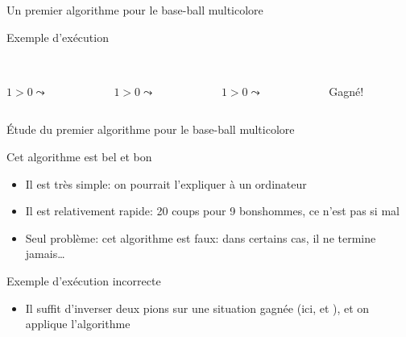 \documentclass[final,hyperref={pdfpagelabels=false}]{beamer}
\renewenvironment{Coupe}{   }{   }
\renewcommand*{\small}{\fontsize{\resultsmallX}{\resultsmallY}\selectfont}
\begin{document}
\begin{Coupe}
\begin{frame}{Un premier algorithme pour le base-ball multicolore}
\begin{block}{Exemple d'exécution}
\begin{columns}[t]
      \begin{column}{.15\linewidth}\center
        \\
         {\small $1>0\leadsto$ }
      \end{column}

      \begin{column}{.15\linewidth}\center
        \\
         {\small $1>0\leadsto$ }
      \end{column}

      \begin{column}{.15\linewidth}\center
        \\
         {\small $1>0\leadsto$ }
      \end{column}

      \begin{column}{.15\linewidth}\center
        \\
         \alert{Gagné!}
      \end{column}
    \end{columns}
  \end{block}
\end{frame}
\newcommand{\maisonOk}[1]{\foreach \x in {#1} {\draw[shift=(m.corner \x)] node
    {\small \Smiley};}}
\begin{frame}{Étude du premier algorithme pour le base-ball multicolore}
  \begin{block}{Cet algorithme est bel et bon}
    \begin{itemize}
    \item Il est très simple: on pourrait l'expliquer à un ordinateur
    \item Il est relativement rapide: 20 coups pour 9 bonshommes, ce n'est pas
      si mal
    \item Seul problème: cet algorithme est faux: dans certains cas, il ne
      termine jamais\ldots
    \end{itemize}
  \end{block}

  \begin{block}{Exemple d'exécution incorrecte}
    \begin{itemize}
    \item Il suffit d'inverser deux pions sur une situation gagnée (ici,
       et ), et on applique l'algorithme 
    \end{itemize}\vspace{-\baselineskip}


\end{block}
\end{frame}
\end{Coupe}
\end{document}
